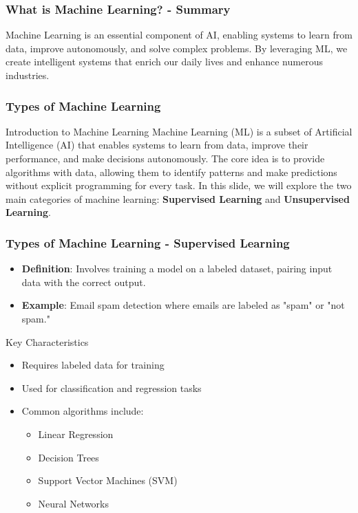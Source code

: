\documentclass[aspectratio=169]{beamer}
\begin{document}
\begin{frame}[fragile]
    \frametitle{What is Machine Learning? - Summary}
    Machine Learning is an essential component of AI, enabling systems to learn from data, improve autonomously, and solve complex problems. By leveraging ML, we create intelligent systems that enrich our daily lives and enhance numerous industries.
\end{frame}

\begin{frame}[fragile]
    \frametitle{Types of Machine Learning}
    \begin{block}{Introduction to Machine Learning}
        Machine Learning (ML) is a subset of Artificial Intelligence (AI) that enables systems to learn from data, improve their performance, and make decisions autonomously.
        The core idea is to provide algorithms with data, allowing them to identify patterns and make predictions without explicit programming for every task.
        In this slide, we will explore the two main categories of machine learning: \textbf{Supervised Learning} and \textbf{Unsupervised Learning}.
    \end{block}
\end{frame}

\begin{frame}[fragile]
    \frametitle{Types of Machine Learning - Supervised Learning}
    \begin{itemize}
        \item \textbf{Definition}: Involves training a model on a labeled dataset, pairing input data with the correct output.
        \item \textbf{Example}: Email spam detection where emails are labeled as "spam" or "not spam."
    \end{itemize}

    \begin{block}{Key Characteristics}
        \begin{itemize}
            \item Requires labeled data for training
            \item Used for classification and regression tasks
            \item Common algorithms include:
            \begin{itemize}
                \item Linear Regression
                \item Decision Trees
                \item Support Vector Machines (SVM)
                \item Neural Networks
            \end{itemize}
        \end{itemize}
    \end{block}
\end{frame}
\end{document}
